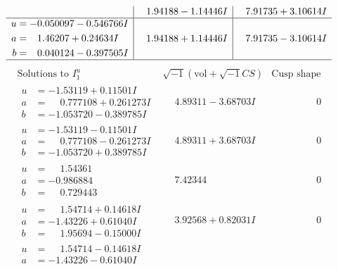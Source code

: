 \documentclass[1p]{elsarticle_modified}
\theoremstyle{definition}
\newcommand{\I}{\sqrt{-1}}
\begin{document}
$$\begin{array}{c|c|c}
 & \phantom{-}1.94188 - 1.14446 I & \phantom{-}7.91735 + 3.10614 I \\ \hline\begin{aligned}
u &= -0.050097 - 0.546766 I \\
a &= \phantom{-}1.46207 + 0.24634 I \\
b &= \phantom{-}0.040124 - 0.397505 I\end{aligned}
 & \phantom{-}1.94188 + 1.14446 I & \phantom{-}7.91735 - 3.10614 I\\
 \hline 
 \end{array}$$\newpage$$\begin{array}{c|c|c}  
\text{Solutions to }I^u_{1}& \I (\text{vol} + \sqrt{-1}CS) & \text{Cusp shape}\\
 \hline 
\begin{aligned}
u &= -1.53119 + 0.11501 I \\
a &= \phantom{-}0.777108 + 0.261273 I \\
b &= -1.053720 - 0.389785 I\end{aligned}
 & \phantom{-}4.89311 - 3.68703 I & \phantom{-0.000000 } 0 \\ \hline\begin{aligned}
u &= -1.53119 - 0.11501 I \\
a &= \phantom{-}0.777108 - 0.261273 I \\
b &= -1.053720 + 0.389785 I\end{aligned}
 & \phantom{-}4.89311 + 3.68703 I & \phantom{-0.000000 } 0 \\ \hline\begin{aligned}
u &= \phantom{-}1.54361\phantom{ +0.000000I} \\
a &= -0.986884\phantom{ +0.000000I} \\
b &= \phantom{-}0.729443\phantom{ +0.000000I}\end{aligned}
 & \phantom{-}7.42344\phantom{ +0.000000I} & \phantom{-0.000000 } 0 \\ \hline\begin{aligned}
u &= \phantom{-}1.54714 + 0.14618 I \\
a &= -1.43226 + 0.61040 I \\
b &= \phantom{-}1.95694 - 0.15000 I\end{aligned}
 & \phantom{-}3.92568 + 0.82031 I & \phantom{-0.000000 } 0 \\ \hline\begin{aligned}
u &= \phantom{-}1.54714 - 0.14618 I \\
a &= -1.43226 - 0.61040 I \\

\end{aligned}
\end{array}$$
\end{document}
